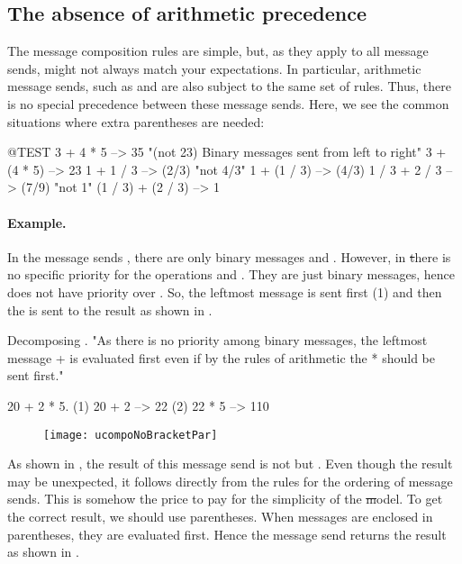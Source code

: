 \documentclass[a4paper,10pt,twoside]{book}
\begin{document}
\subsection{The absence of arithmetic precedence}
The message composition rules are simple, but, as they apply to all message sends, might not always match your expectations. 
In particular, arithmetic message sends, such as \ct{+} and \ct{*} are also subject to the same set of rules.
Thus, there is no special precedence between these message sends.
Here, we see the common situations where extra parentheses are needed:

\begin{code}{@TEST}
3 + 4 * 5      --> 35    "(not 23)  Binary messages sent from left to right"
3 + (4 * 5)    --> 23
1 + 1 / 3         --> (2/3)    "not 4/3"
1 + (1 / 3)       --> (4/3)
1 / 3 + 2 / 3       --> (7/9)    "not 1"
(1 / 3) + (2 / 3)  --> 1
\end{code}

\paragraph{Example.} 
In the message sends , there are only binary messages \ct{+} and \ct{*}.
However, in \st there is no specific priority for the operations \ct{+} and \ct{*}.
They are just binary messages, hence \ct{*} does not have priority over \ct{+}.
So, the leftmost message \ct{+} is sent first (1) and then the \ct{*} is sent to the result as shown in .  

\begin{example}[binaryMessages1]{Decomposing .}{}
"As there is no priority among binary messages, the leftmost message + is evaluated first even if by the rules of arithmetic the * should be sent first."

      20 + 2 * 5. 
(1)  20 + 2 --> 22
(2)  22       * 5 --> 110
\end{example}

\begin{figure}
\begin{center}\texttt{[image: ucompoNoBracketPar]}\end{center}
\end{figure}
\noindent
As shown in , the result of this message send is not  but .
Even though the result may be unexpected, it follows directly from the rules for the ordering of message sends.
This is somehow the price to pay for the simplicity of the \st model.
To get the correct result, we should use parentheses.
When messages are enclosed in parentheses, they are evaluated first.
Hence the message send  returns the result as shown in .
\end{document}
